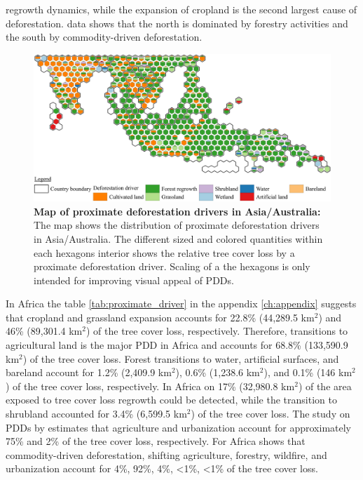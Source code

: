 regrowth dynamics, while the expansion of cropland is the second largest cause of deforestation. \citet{Curtis2018} data shows that the north is dominated by forestry activities and the south by commodity-driven deforestation.
			\begin{figure}[ht]
				\centering
				\includegraphics[scale=1]{img/asia_driver_frameless}
				\caption[Map of proximate deforestation drivers in Asia/Australia]{\textbf{Map of proximate deforestation drivers in Asia/Australia:} The map shows the distribution of proximate deforestation drivers in Asia/Australia. The different sized and colored quantities within each hexagons interior shows the relative tree cover loss by a proximate deforestation driver. Scaling of a the hexagons is only intended for improving visual appeal of \acp{PDD}.}
				\label{fig:asia_driver}
			\end{figure}

			In Africa the table \ref{tab:proximate_driver} in the appendix \ref{ch:appendix} suggests that cropland and grassland expansion accounts for 22.8\% (44,289.5 km$^2$) and 46\% (89,301.4 km$^2$) of the tree cover loss, respectively. Therefore, transitions to agricultural land is the major \ac{PDD} in Africa and accounts for 68.8\% (133,590.9 km$^2$) of the tree cover loss. Forest transitions to water, artificial surfaces, and bareland account for 1.2\% (2,409.9 km$^2$), 0.6\% (1,238.6 km$^2$), and 0.1\% (146 km$^2$) of the tree cover loss, respectively. In Africa on 17\% (32,980.8 km$^2$) of the area exposed to tree cover loss regrowth could be detected, while the transition to shrubland accounted for 3.4\% (6,599.5 km$^2$) of the tree cover loss. The study on \acp{PDD} by \citet{Hosonuma2012} estimates that agriculture and urbanization account for approximately 75\% and 2\% of the tree cover loss, respectively. For Africa \citet{Curtis2018} shows that commodity-driven deforestation, shifting agriculture, forestry, wildfire, and urbanization account for 4\%, 92\%, 4\%, <1\%, <1\% of the tree cover loss. 

